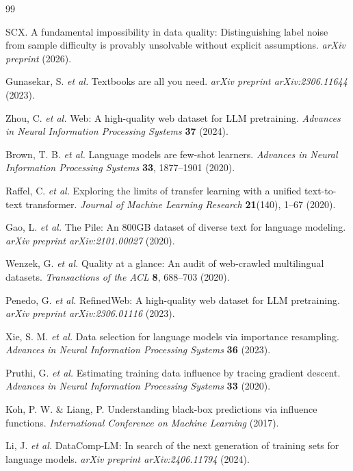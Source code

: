 \documentclass[11pt,twocolumn]{article}
\begin{document}
\begin{thebibliography}{99}

SCX. A fundamental impossibility in data quality: Distinguishing label noise from sample difficulty is provably unsolvable without explicit assumptions. \textit{arXiv preprint} (2026).

Gunasekar, S. \textit{et al.} Textbooks are all you need. \textit{arXiv preprint arXiv:2306.11644} (2023).

Zhou, C. \textit{et al.} Web: A high-quality web dataset for LLM pretraining. \textit{Advances in Neural Information Processing Systems} \textbf{37} (2024).

Brown, T. B. \textit{et al.} Language models are few-shot learners. \textit{Advances in Neural Information Processing Systems} \textbf{33}, 1877--1901 (2020).

Raffel, C. \textit{et al.} Exploring the limits of transfer learning with a unified text-to-text transformer. \textit{Journal of Machine Learning Research} \textbf{21}(140), 1--67 (2020).

Gao, L. \textit{et al.} The Pile: An 800GB dataset of diverse text for language modeling. \textit{arXiv preprint arXiv:2101.00027} (2020).

Wenzek, G. \textit{et al.} Quality at a glance: An audit of web-crawled multilingual datasets. \textit{Transactions of the ACL} \textbf{8}, 688--703 (2020).

Penedo, G. \textit{et al.} RefinedWeb: A high-quality web dataset for LLM pretraining. \textit{arXiv preprint arXiv:2306.01116} (2023).

Xie, S. M. \textit{et al.} Data selection for language models via importance resampling. \textit{Advances in Neural Information Processing Systems} \textbf{36} (2023).

Pruthi, G. \textit{et al.} Estimating training data influence by tracing gradient descent. \textit{Advances in Neural Information Processing Systems} \textbf{33} (2020).

Koh, P. W. \& Liang, P. Understanding black-box predictions via influence functions. \textit{International Conference on Machine Learning} (2017).

Li, J. \textit{et al.} DataComp-LM: In search of the next generation of training sets for language models. \textit{arXiv preprint arXiv:2406.11794} (2024).


\end{thebibliography}
\end{document}
